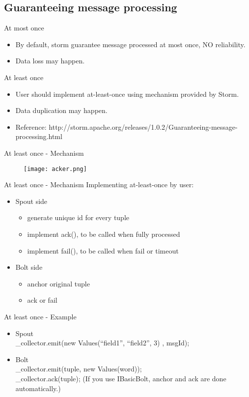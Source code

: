 \documentclass{beamer}
\begin{document}
\subsection{Guaranteeing message processing}
\begin{frame}{At most once}
  \begin{itemize}
    \item By default, storm guarantee message processed at most once, NO reliability.
    \item Data loss may happen.
  \end{itemize}
\end{frame}
\begin{frame}{At least once}
  \begin{itemize}
    \item User should implement at-least-once using mechanism provided by Storm.
    \item Data duplication may happen.
    \item Reference: http://storm.apache.org/releases/1.0.2/Guaranteeing-message-processing.html
  \end{itemize}
  
\end{frame}
\begin{frame}{At least once - Mechanism}
  \begin{figure}
    \centering
    \texttt{[image: acker.png]}
  \end{figure}
\end{frame}
\begin{frame}{At least once - Mechanism}
  Implementing at-least-once by user:
  \begin{itemize}
    \item Spout side
      \begin{itemize}
	\item generate unique id for every tuple
	\item implement ack(), to be called when fully processed
	\item implement fail(), to be called when fail or timeout
      \end{itemize}
    \item Bolt side
      \begin{itemize}
	\item anchor original tuple
	\item ack or fail
      \end{itemize}

  \end{itemize}
\end{frame}
\begin{frame}{At least once - Example}
  \begin{itemize}
    \item Spout\\
      \_collector.emit(new Values(``field1'', ``field2'', 3) , msgId);
    \item Bolt\\
      \_collector.emit(tuple, new Values(word)); \\
      \_collector.ack(tuple);
      (If you use IBasicBolt, anchor and ack are done automatically.)
  \end{itemize}
\end{frame}
\end{document}
